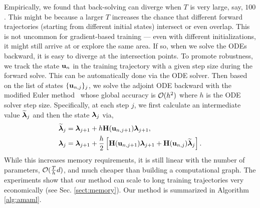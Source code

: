 Empirically, we found that back-solving can diverge when $T$ is very large, say, $100$. {This might be because a larger $T$ increases the chance that different forward trajectories (\ie starting from different initial states) intersect or even overlap. This is not uncommon for gradient-based training --- even with different initializations, it might still arrive at or explore the same area. If so, when we solve the ODEs backward, it is easy to diverge at the intersection points.} To promote robustness, we track the state ${\bf u}_n$ in the training trajectory with a given step size during the forward solve. This can be automatically done via the ODE solver. Then based on the list of states $\{{\bf u}_{n,j}\}_j$, we solve the adjoint ODE backward with the modified Euler method~\citep{ascher1998computer} whose global accuracy is $\mathcal{O}(h^2)$ where $h$ is the ODE solver step size.  Specifically, at each step $j$, we first calculate an intermediate value $\widetilde{\boldsymbol{\lambda}}_j$ and then the state $\boldsymbol{\lambda}_j$ via,
\begin{align}
	\widetilde{\boldsymbol{\lambda}}_{j} &= \boldsymbol{\lambda}_{j+1} + h {\bf H}({\bf u}_{n,j+1})\boldsymbol{\lambda}_{j+1}, \notag \\
	 \boldsymbol{\lambda}_j &= \boldsymbol{\lambda}_{j+1} + \frac{h}{2}\left[{\bf H}({\bf u}_{n,j+1})\boldsymbol{\lambda}_{j+1} + {\bf H}({\bf u}_{n,j})\widetilde{\boldsymbol{\lambda}}_{j}\right]. \notag 
\end{align}
While this increases memory requirements, it is still linear with the number of parameters, $\mathcal{O}(\frac{T}{h} d)$, and much cheaper than building a computational graph. The experiments show that our method can  scale to long training trajectories very economically (see Sec. \ref{sect:memory}). Our method is summarized in Algorithm \ref{alg:amaml}. 

